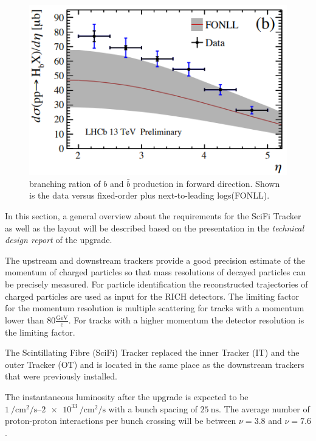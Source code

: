 \begin{figure}
  \centering
  \includegraphics{plots/bbar_forward.png}
  \caption{branching ration of $b$ and $\bar{b}$ production in forward direction. Shown is the data versus fixed-order plus next-to-leading logs(FONLL)\cite{forward}\cite{fonll}.}
  \label{fig:bbforward}
\end{figure}

In this section, a general overview about the requirements for the SciFi Tracker as well as the layout will be described based on the presentation in the \textit{technical design report}\cite{scifiInfo} of the upgrade.

The upstream and downstream trackers provide a good precision estimate of the momentum of charged particles so that mass resolutions of decayed particles can be precisely measured.
For particle identification the reconstructed trajectories of charged particles are used as input for the RICH detectors.
The limiting factor for the momentum resolution is multiple scattering for tracks with a momentum lower than $\num{80}\frac{\text{GeV}}{\text{c}}$. For tracks with a higher momentum the detector resolution is the limiting factor.

The Scintillating Fibre (SciFi) Tracker replaced the inner Tracker (IT) and the outer Tracker (OT)
and is located in the same place as the downstream trackers that were previously installed.

The instantaneous luminosity after the upgrade is expected to be $\SIrange{1}{2e33}{\per\centi\metre\squared\per\second}$ with a bunch spacing of $\SI{25}{\nano\second}$.
The average number of proton-proton interactions per bunch crossing will be between
$\nu = 3.8$ and $\nu = 7.6$.

